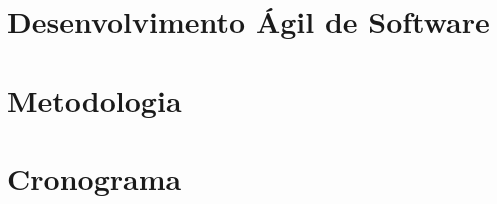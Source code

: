 \documentclass[a4paper,11pt]{article}
\begin{document}
\section{Desenvolvimento Ágil de Software}

\section{Metodologia}

\section{Cronograma}



\end{document}
